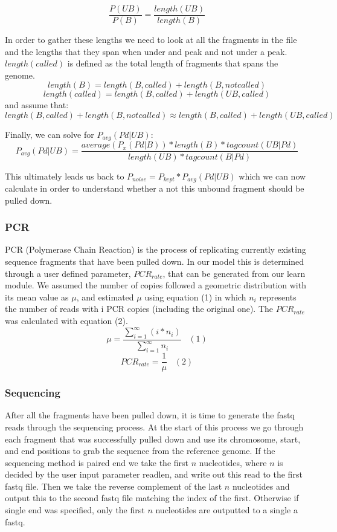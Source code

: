 \documentclass[12pt]{article}
\begin{document}
$$\dfrac{P(UB)}{P(B)} = \dfrac{length(UB)}{length(B)}$$

In order to gather these lengths we need to look at all the fragments in the file and the lengths that they span when under and peak and not under a peak. $length(called)$ is defined as the total length of fragments that spans the genome. 
$$length(B) = length(B, called) + length(B, not called)$$
$$length(called) = length(B, called) + length(UB, called)$$
and assume that:
$$length(B, called) + length(B, not called) \approx length(B, called) + length(UB, called)$$

Finally, we can solve for $P_{avg}(Pd|UB)$:
$$P_{avg}(Pd|UB) = \dfrac{average(P_x(Pd|B))*length(B)*tagcount(UB|Pd)}{length(UB)*tagcount(B|Pd)}$$

This ultimately leads us back to $P_{noise} = P_{kept}*P_{avg}(Pd|UB)$ which we can now calculate in order to understand whether a not this unbound fragment should be pulled down.

\subsubsection*{PCR}

PCR (Polymerase Chain Reaction) is the process of replicating currently existing sequence fragments that have been pulled down. In our model this is determined through a user defined parameter, $PCR_{rate}$, that can be generated from our learn module. We assumed the number of copies followed a geometric distribution with its mean value as $\mu$, and estimated $\mu$ using equation (1) in which $n_i$ represents the number of reads with i PCR copies (including the original one). The $PCR_{rate}$ was calculated with equation (2).
$$\mu = \frac{\sum_{i=1}^\infty (i * n_i)}{\sum_{i=1}^\infty n_i} \;\;\;(1)$$
$$PCR_{rate} = \frac{1}{\mu}\;\;\;(2)$$

\subsubsection*{Sequencing}

After all the fragments have been pulled down, it is time to generate the fastq reads through the sequencing process. At the start of this process we go through each fragment that was successfully pulled down and use its chromosome, start, and end positions to grab the sequence from the reference genome. If the sequencing method is paired end we take the first $n$ nucleotides, where $n$ is decided by the user input parameter readlen, and write out this read to the first fastq file. Then we take the reverse complement of the last $n$ nucleotides and output this to the second fastq file matching the index of the first. Otherwise if single end was specified, only the first $n$ nucleotides are outputted to a single a fastq.
\end{document}
